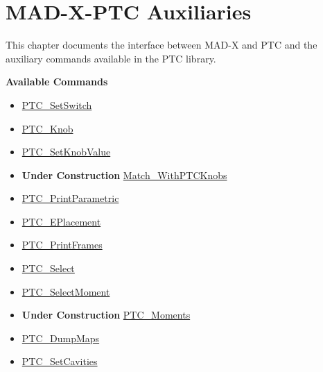 
\chapter{MAD-X-PTC Auxiliaries}

This chapter documents the interface between MAD-X and PTC and the
auxiliary commands available in the PTC library.

{\bf Available Commands }
\begin{itemize}
   \item \href{PTC_SetSwitch.html}{ PTC\_SetSwitch}
   \item \href{PTC_Knob.html}{ PTC\_Knob}
   \item \href{PTC_SetKnobValue.html}{ PTC\_SetKnobValue}
   \item {\bf Under Construction} \href{Match_WithPTCKnobs.html}{ Match\_WithPTCKnobs}
   \item \href{PTC_PrintParametric.html}{ PTC\_PrintParametric}
   \item \href{PTC_EPlacement.html}{ PTC\_EPlacement}
   \item \href{PTC_PrintFrames.html}{ PTC\_PrintFrames}
   \item \href{PTC_Select.html}{ PTC\_Select}
   \item \href{PTC_SelectMoment.html}{ PTC\_SelectMoment}
   \item {\bf Under Construction} \href{PTC_Moments.html}{ PTC\_Moments}
   \item \href{PTC_DumpMaps.html}{  PTC\_DumpMaps}
   \item \href{PTC_SetCavities.html}{ PTC\_SetCavities}
\end{itemize}

\newpage







 











